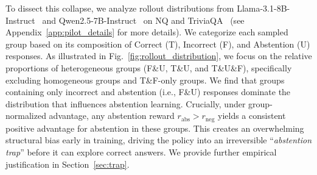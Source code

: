 \documentclass{article} %
\begin{document}
To dissect this collapse, we analyze rollout distributions from Llama-3.1-8B-Instruct~\citep{Llama3} and Qwen2.5-7B-Instruct~\citep{Qwen2.5} on NQ and TriviaQA~\citep{Triviaqa} (see Appendix~\ref{app:pilot_details} for more details). 
We categorize each sampled group based on its composition of Correct (T), Incorrect (F), and Abstention (U) responses. As illustrated in Fig.~\ref{fig:rollout_distribution}, we focus on the relative proportions of heterogeneous groups (F\&U, T\&U, and T\&U\&F), specifically excluding homogeneous groups and T\&F-only groups. We find that groups containing only incorrect and abstention (i.e., F\&U) responses dominate the distribution that influences abstention learning.
Crucially, under group-normalized advantage, any abstention reward $r_{\text{abs}} > r_{\text{neg}}$ yields a consistent positive advantage for abstention in these groups. This creates an overwhelming structural bias early in training, driving the policy into an irreversible ``\textit{abstention trap}'' before it can explore correct answers. We provide further empirical justification in Section~\ref{sec:trap}.






\end{document}
